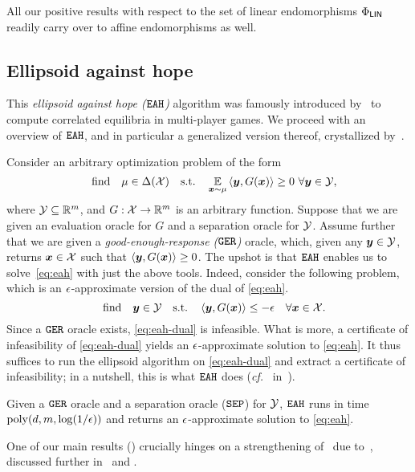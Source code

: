 
All our positive results with respect to the set of linear endomorphisms $\Phi_\mathsf{LIN}$ readily carry over to affine endomorphisms as well.

\subsection{Ellipsoid against hope}
\label{sec:eah}

This \emph{ellipsoid against hope ($\mathtt{EAH}$)} algorithm was famously introduced by~\citet{Papadimitriou08:Computing} to compute correlated equilibria in multi-player games. We proceed with an overview of $\mathtt{EAH}$, and in particular a generalized version thereof, crystallized by~\citet{Farina24:Polynomial}.

Consider an arbitrary optimization problem of the form
\begin{equation}\label{eq:eah}
    \qq{find} \mu \in \Delta(\cX) \qq{s.t.} \E_{\vx \sim \mu} \ip{\vy, G(\vx)} \ge 0 \text{ } \forall \vy \in \cY,
\end{equation}
where ${\mathcal{Y}} \subseteq \mathbb R^m$, and $G : {\mathcal{X}} \to \mathbb R^m$ is an arbitrary function. Suppose that we are given an evaluation oracle for $G$ and a separation oracle for ${\mathcal{Y}}$. Assume further that we are given a {\em good-enough-response ($\mathtt{GER}$)} oracle, which, given any ${\bm{y}} \in {\mathcal{Y}}$, returns ${\bm{x}} \in {\mathcal{X}}$ such that $\ip{\vy, G(\vx)} \ge 0$. The upshot is that $\mathtt{EAH}$ enables us to solve~\eqref{eq:eah} with just the above tools. Indeed, consider the following problem, which is an $\epsilon$-approximate version of the dual of \eqref{eq:eah}.
\begin{equation} \label{eq:eah-dual}
    \qq{find} \vy \in \cY \qq{s.t.} \ip{\vy, G(\vx)} \le -\eps \quad \forall \vx \in \cX.
\end{equation}
Since a $\mathtt{GER}$ oracle exists, \eqref{eq:eah-dual} is infeasible. What is more, a certificate of infeasibility of \eqref{eq:eah-dual} yields an $\epsilon$-approximate solution to \eqref{eq:eah}. It thus suffices to run the ellipsoid algorithm on \eqref{eq:eah-dual} and extract a certificate of infeasibility; in a nutshell, this is what $\mathtt{EAH}$ does (\emph{cf.}~ in~).

\begin{theorem}
    \label{theorem:eah}
    Given a $\mathtt{GER}$ oracle and a separation oracle ($\mathtt{SEP}$) for ${\mathcal{Y}}$, $\mathtt{EAH}$ runs in time $\mathrm{poly}(d, m, \log(1/\epsilon))$ and returns an $\epsilon$-approximate solution to \eqref{eq:eah}.
\end{theorem}

One of our main results () crucially hinges on a strengthening of~ due to~\citet{Daskalakis24:Efficient}, discussed further in~ and .